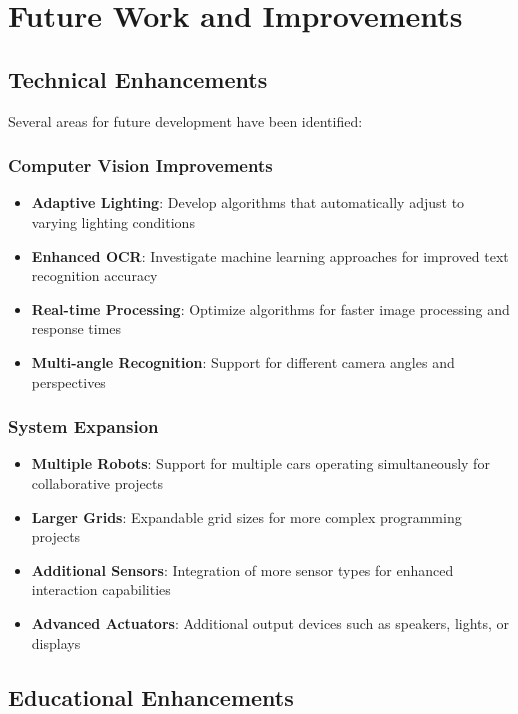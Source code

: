 \section{Future Work and Improvements}

\subsection{Technical Enhancements}

Several areas for future development have been identified:

\subsubsection{Computer Vision Improvements}
\begin{itemize}
    \item \textbf{Adaptive Lighting}: Develop algorithms that automatically adjust to varying lighting conditions
    \item \textbf{Enhanced OCR}: Investigate machine learning approaches for improved text recognition accuracy
    \item \textbf{Real-time Processing}: Optimize algorithms for faster image processing and response times
    \item \textbf{Multi-angle Recognition}: Support for different camera angles and perspectives
\end{itemize}

\subsubsection{System Expansion}
\begin{itemize}
    \item \textbf{Multiple Robots}: Support for multiple cars operating simultaneously for collaborative projects
    \item \textbf{Larger Grids}: Expandable grid sizes for more complex programming projects
    \item \textbf{Additional Sensors}: Integration of more sensor types for enhanced interaction capabilities
    \item \textbf{Advanced Actuators}: Additional output devices such as speakers, lights, or displays
\end{itemize}

\subsection{Educational Enhancements}

